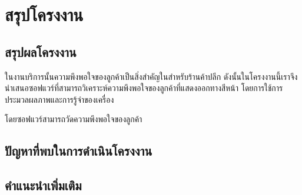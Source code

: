 \chapter{สรุปโครงงาน}
\section{สรุปผลโครงงาน}
ในงานบริการนั้นความพึงพอใจของลูกค้าเป็นสิ่งสำคัญในสำหรับร้านค้าปลีก ดังนั้นในโครงงานนี้เราจึงนำเสนอซอฟแวร์ที่สามารถวิเคราะห์ความพึงพอใจของลูกค้าที่แสดงออกทางสีหน้า โดยการใช้การประมวลผลภาพและการรู้จำของเครื่อง

โดยซอฟแวร์สามารถวัดความพึงพอใจของลูกค้า

\section{ปัญหาที่พบในการดำเนินโครงงาน}


\section{คำแนะนำเพิ่มเติม}
